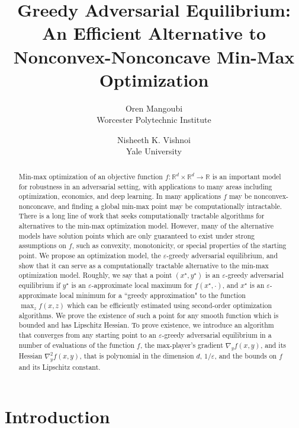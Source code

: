 \documentclass[11pt,letterpaper]{article}
\title{\bf Greedy Adversarial Equilibrium: An Efficient Alternative to Nonconvex-Nonconcave Min-Max Optimization}
\author{Oren Mangoubi \\ Worcester Polytechnic Institute \and Nisheeth K. Vishnoi \\ Yale University}
\date{}
\begin{document}
\maketitle

\begin{abstract}

Min-max optimization of an objective function $f: \mathbb{R}^d \times \mathbb{R}^d \rightarrow \mathbb{R}$ is an important model for robustness in an adversarial setting, 
 with applications to many areas including optimization, economics, and deep learning.
In many applications $f$ may be nonconvex-nonconcave, and finding a global min-max point may be computationally intractable. 
%
There is a long line of work that seeks computationally tractable algorithms for alternatives to the min-max optimization model.
%
However, many of the alternative models have solution points which are only guaranteed to exist under strong assumptions on $f$, such as convexity, monotonicity, or special properties of the starting point. 
%
We propose an optimization model, the $\varepsilon$-greedy adversarial equilibrium, and show that it can serve as a computationally tractable alternative to the min-max optimization model.
%
Roughly, we say that a point $(x^\star, y^\star)$ is an $\varepsilon$-greedy adversarial equilibrium if $y^\star$ is an $\varepsilon$-approximate local maximum for $f(x^\star,\cdot)$, and $x^\star$ is an $\varepsilon$-approximate local minimum for a ``greedy approximation" to the function $\max_z f(x, z)$ which can be efficiently estimated using second-order optimization algorithms.
%
We prove the existence of such a point for any smooth function which is bounded and has Lipschitz Hessian. To prove existence, we introduce an algorithm that converges from any starting point to an $\varepsilon$-greedy adversarial equilibrium in a number of evaluations of the function $f$, the max-player's gradient $\nabla_y f(x,y)$, and its Hessian  $\nabla^2_y f(x,y)$, that is polynomial in the dimension $d$, $1/\varepsilon$, and the bounds on $f$ and its Lipschitz constant. 


%
\end{abstract}

\newpage
\tableofcontents
\newpage



\section{Introduction} \label{sec_introduction}
\end{document}
